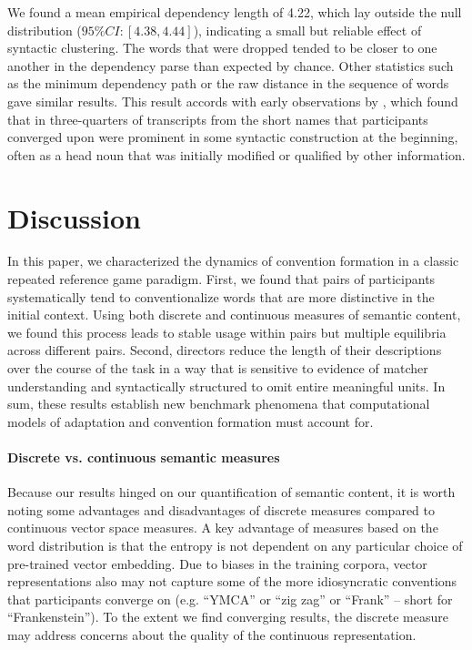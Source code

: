 \documentclass[alpha-refs]{wiley-article}
\begin{document}
We found a mean empirical dependency length of 4.22, which lay outside the null distribution ($95\% CI: [4.38, 4.44]$), indicating a small but reliable effect of syntactic clustering.
The words that were dropped tended to be closer to one another in the dependency parse than expected by chance.
Other statistics such as the minimum dependency path or the raw distance in the sequence of words gave similar results.
This result accords with early observations by \cite{Carroll80_NamingHedges}, which found that in three-quarters of transcripts from \cite{KraussWeinheimer64_ReferencePhrases} the short names that participants converged upon were prominent in some syntactic construction at the beginning, often as a head noun that was initially modified or qualified by other information. 

\section{Discussion}
\label{sec:discussion}

In this paper, we characterized the dynamics of convention formation in a classic repeated reference game paradigm.
First, we found that pairs of participants systematically tend to conventionalize words that are more distinctive in the initial context.
Using both discrete and continuous measures of semantic content, we found this process leads to stable usage within pairs but multiple equilibria across different pairs.
Second, directors reduce the length of their descriptions over the course of the task in a way that is sensitive to evidence of matcher understanding and syntactically structured to omit entire meaningful units.
In sum, these results establish new benchmark phenomena that computational models of adaptation and convention formation must account for.

\paragraph{Discrete vs. continuous semantic measures}
Because our results hinged on our quantification of semantic content, it is worth noting some advantages and disadvantages of discrete measures compared to continuous vector space measures.
A key advantage of measures based on the word distribution is that the entropy is not dependent on any particular choice of pre-trained vector embedding. 
Due to biases in the training corpora, vector representations also may not capture some of the more idiosyncratic conventions that participants converge on (e.g. ``YMCA'' or ``zig zag'' or ``Frank'' -- short for ``Frankenstein'').
To the extent we find converging results, the discrete measure may address concerns about the quality of the continuous representation.
\end{document}
